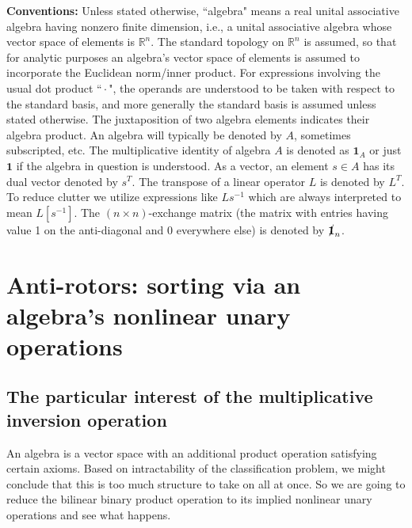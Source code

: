 \documentclass{amsart}
\numberwithin{equation}{section}
\theoremstyle{definition}
\numberwithin{theorem}{section}
\begin{document}
  {\bf Conventions:}  Unless stated otherwise, ``algebra" means a real unital associative algebra having nonzero finite dimension, i.e., a unital associative algebra whose vector space of elements is $\mathbb{R}^n$. The standard topology on $\mathbb{R}^n$ is assumed, so that for analytic purposes an algebra's vector space of elements is assumed to incorporate the Euclidean norm/inner product.  For expressions involving the usual dot product ``\,$\cdot$\,", the operands are understood to be taken with respect to the standard basis, and more generally the standard basis is assumed unless stated otherwise. The juxtaposition of two algebra elements indicates their algebra product.  An algebra will typically be denoted by $A$, sometimes subscripted, etc. The multiplicative identity of algebra $A$ is denoted as $\mathbf{1}_A$ or just $\mathbf{1}$ if the algebra in question is understood.   As a vector, an element $s\in A$ has its dual vector denoted by $s^T$. The transpose of a linear operator $L$ is denoted by $L^T$.  To reduce clutter we utilize expressions like $Ls^{-1}$ which are always interpreted to mean $L[s^{-1}]$. The $(n\times n)$-exchange matrix (the matrix with entries having value 1 on the anti-diagonal and 0 everywhere else) is denoted by  $\slashed{\bf 1}_n$.  
 

 \section{Anti-rotors: sorting via an algebra's nonlinear unary operations}
 
 \subsection{The particular interest of the multiplicative inversion operation} An algebra is a vector space with an additional product operation satisfying certain axioms.  Based on intractability of the classification problem, we might conclude that this is too much structure to take on all at once.  So we are going to reduce the bilinear binary product operation to its implied nonlinear unary operations and see what happens. 
 
\end{document}
